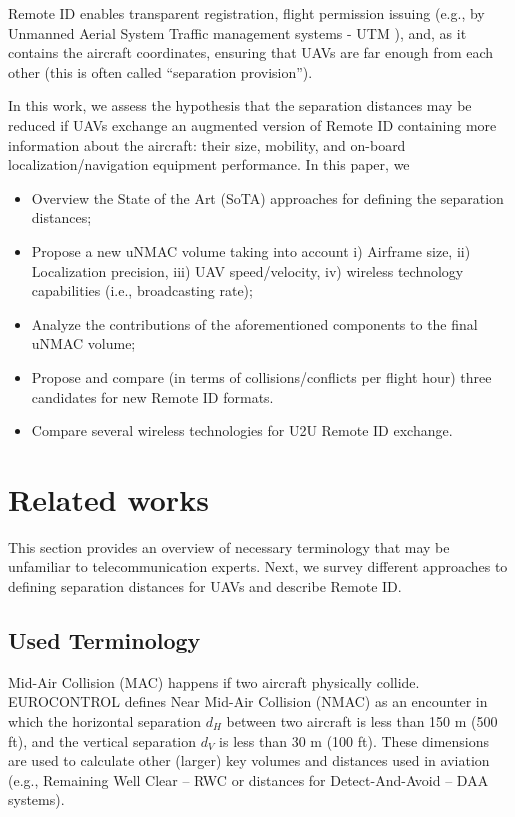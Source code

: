\documentclass[10pt,conference]{IEEEtran}
\begin{document}
Remote ID \cite{Drone_ID} enables transparent registration, flight permission issuing (e.g., by Unmanned Aerial System Traffic management systems - UTM \cite{Vinogradov20, BAURANOV2021}), and, as it contains the aircraft coordinates, ensuring that UAVs are far enough from each other (this is often called “separation provision”).

In this work, we assess the hypothesis that the separation distances may be reduced if UAVs exchange an augmented version of Remote ID containing more information about the aircraft: their size, mobility, and on-board localization/navigation equipment performance. In this paper, we
\begin{itemize}
    \item Overview the State of the Art (SoTA) approaches for defining the separation distances;
    \item Propose a new uNMAC volume taking into account i) Airframe size, ii) Localization precision, iii) UAV speed/velocity, iv) wireless technology capabilities (i.e., broadcasting rate);    
    \item Analyze the contributions of the aforementioned components to the final uNMAC volume;
    \item Propose and compare (in terms of collisions/conflicts per flight hour) three candidates for new Remote ID formats.
    \item Compare several wireless technologies for  U2U Remote ID exchange.
\end{itemize}



\section{Related works}
This section provides an overview of necessary terminology that may be unfamiliar to telecommunication experts. Next, we survey different approaches to defining separation distances for UAVs and describe Remote ID.

\subsection{Used Terminology}
Mid-Air Collision (MAC) happens if two aircraft physically collide. EUROCONTROL defines \cite{eurocontrol} Near Mid-Air Collision (NMAC) as an encounter in which the horizontal separation $d_H$ between two aircraft is less than 150 m (500 ft), and the vertical separation $d_V$  is less than 30 m (100 ft). 
These dimensions are used to calculate other (larger) key volumes and distances used in aviation (e.g., Remaining Well Clear – RWC\cite{Vinogradov20} or distances for Detect-And-Avoid – DAA systems). 
\end{document}
